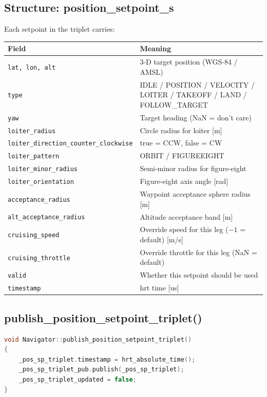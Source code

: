 \documentclass[12pt,a4paper]{article}
\begin{document}
\subsection{Structure: position\_setpoint\_s}

Each setpoint in the triplet carries:
\begin{center}\begin{tabular}{ll}\toprule
Field & Meaning \\\midrule
\texttt{lat, lon, alt} & 3-D target position (WGS-84 / AMSL) \\
\texttt{type} & IDLE / POSITION / VELOCITY / LOITER / TAKEOFF / LAND / FOLLOW\_TARGET \\
\texttt{yaw} & Target heading (NaN = don't care) \\
\texttt{loiter\_radius} & Circle radius for loiter [m] \\
\texttt{loiter\_direction\_counter\_clockwise} & true = CCW, false = CW \\
\texttt{loiter\_pattern} & ORBIT / FIGUREEIGHT \\
\texttt{loiter\_minor\_radius} & Semi-minor radius for figure-eight \\
\texttt{loiter\_orientation} & Figure-eight axis angle [rad] \\
\texttt{acceptance\_radius} & Waypoint acceptance sphere radius [m] \\
\texttt{alt\_acceptance\_radius} & Altitude acceptance band [m] \\
\texttt{cruising\_speed} & Override speed for this leg ($-1$ = default) [m/s] \\
\texttt{cruising\_throttle} & Override throttle for this leg (NaN = default) \\
\texttt{valid} & Whether this setpoint should be used \\
\texttt{timestamp} & hrt time [us] \\
\bottomrule\end{tabular}\end{center}

\subsection{publish\_position\_setpoint\_triplet()}

\begin{lstlisting}[language=C++]
void Navigator::publish_position_setpoint_triplet()
{
    _pos_sp_triplet.timestamp = hrt_absolute_time();
    _pos_sp_triplet_pub.publish(_pos_sp_triplet);
    _pos_sp_triplet_updated = false;
}
\end{lstlisting}
\end{document}
